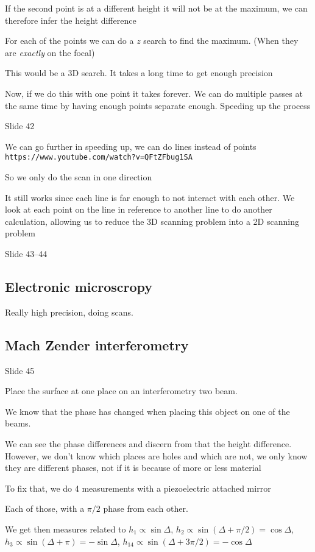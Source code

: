 \documentclass[../main/main.tex]{subfiles}
\begin{document}
If the second point is at a different height it will not be at the maximum, we can therefore infer the height difference

For each of the points we can do a $z$ search to find the maximum. (When they are \emph{exactly} on the focal)

This would be a 3D search. It takes a long time to get enough precision

Now, if we do this with one point it takes forever. We can do multiple passes at the same time by having enough points separate enough. Speeding up the process

Slide 42

We can go further in speeding up, we can do lines instead of points \verb|https://www.youtube.com/watch?v=QFtZFbug1SA|

So we only do the scan in one direction

It still works since each line is far enough to not interact with each other. We look at each point on the line in reference to another line to do another calculation, allowing us to reduce the 3D scanning problem into a 2D scanning problem

Slide 43--44

\subsection{Electronic microscropy}

Really high precision, doing scans.

\subsection{Mach Zender interferometry}

Slide 45

Place the surface at one place on an interferometry two beam.

We know that the phase has changed when placing this object on one of the beams.

We can see the phase differences and discern from that the height difference. However, we don't know which places are holes and which are not, we only know they are different phases, not if it is because of more or less material

To fix that, we do 4 measurements with a piezoelectric attached mirror

Each of those, with a $\pi/2 $ phase from each other.

We get then measures related to $h_1 \propto \sin \Delta$, $h_2 \propto\sin( \Delta + \pi/2) = \cos \Delta$,  $h_3 \propto\sin( \Delta + \pi) = -\sin \Delta$,  $h_14 \propto\sin( \Delta + 3\pi/2) = -\cos \Delta$
\end{document}
